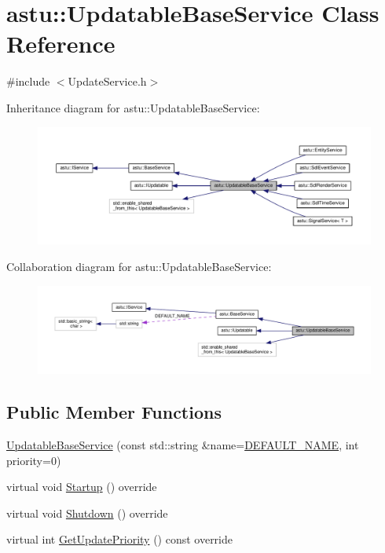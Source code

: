 \hypertarget{classastu_1_1UpdatableBaseService}{}\section{astu\+:\+:Updatable\+Base\+Service Class Reference}
\label{classastu_1_1UpdatableBaseService}


{\ttfamily \#include $<$Update\+Service.\+h$>$}



Inheritance diagram for astu\+:\+:Updatable\+Base\+Service\+:\nopagebreak
\begin{figure}[H]
\begin{center}
\leavevmode
\includegraphics[width=350pt]{classastu_1_1UpdatableBaseService__inherit__graph}
\end{center}
\end{figure}


Collaboration diagram for astu\+:\+:Updatable\+Base\+Service\+:\nopagebreak
\begin{figure}[H]
\begin{center}
\leavevmode
\includegraphics[width=350pt]{classastu_1_1UpdatableBaseService__coll__graph}
\end{center}
\end{figure}
\subsection*{Public Member Functions}
\begin{DoxyCompactItemize}
\item 
\hyperlink{classastu_1_1UpdatableBaseService_affb07c2699a08b42eb5b8ca96ed681c0}{Updatable\+Base\+Service} (const std\+::string \&name=\hyperlink{classastu_1_1BaseService_a9483b26ad631bd14646ef2d2170cd828}{D\+E\+F\+A\+U\+L\+T\+\_\+\+N\+A\+ME}, int priority=0)
\item 
virtual void \hyperlink{classastu_1_1UpdatableBaseService_a47e3725f717cee3cd8983f485b2a0243}{Startup} () override
\item 
virtual void \hyperlink{classastu_1_1UpdatableBaseService_a7ad7e0201007878b6014361dd5ba82f9}{Shutdown} () override
\item 
virtual int \hyperlink{classastu_1_1UpdatableBaseService_a22a9824510d94fa97efb962ae38be945}{Get\+Update\+Priority} () const override
\end{DoxyCompactItemize}
